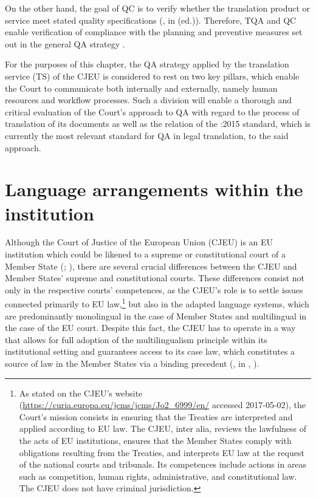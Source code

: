 \documentclass[output=paper]{langsci/langscibook}
\begin{document}
On the other hand, the goal of QC is to verify whether the translation product or service meet stated quality specifications (\citealt[169]{Lušicky2017}, in \citealt{Lommel2015} (ed.)). Therefore, TQA and QC enable verification of compliance with the planning and preventive measures set out in the general QA strategy \citep[169]{Lušicky2017}.

For the purposes of this chapter, the QA strategy applied by the translation service (TS) of the CJEU is considered to rest on two key pillars, which enable the Court to communicate both internally and externally, namely human resources and workflow processes. Such a division will enable a thorough and critical evaluation of the Court’s approach to QA with regard to the process of translation of its documents as well as the relation of the \citeauthor{ISO2015}:2015 standard, which is currently the most relevant standard for QA in legal translation, to the said approach.

\section{Language arrangements within the institution}\label{sec:kozbial:2}

Although the Court of Justice of the European Union (CJEU) is an EU institution which could be likened to a supreme or constitutional court of a Member State (\citealt[10]{Roper2011}; \citealt{Itzcovich2014}), there are several crucial differences between the CJEU and Member States’ supreme and constitutional courts. These differences consist not only in the respective courts’ competences, as the CJEU’s role is to settle issues connected primarily to EU law,\footnote{As stated on the CJEU’s website (\url{https://curia.europa.eu/jcms/jcms/Jo2_6999/en/} accessed 2017-05-02), the Court’s mission consists in ensuring that the Treaties are interpreted and applied according to EU law. The CJEU, inter alia, reviews the lawfulness of the acts of EU institutions, ensures that the Member States comply with obligations resulting from the Treaties, and interprets EU law at the request of the national courts and tribunals. Its competences include actions in areas such as competition, human rights, administrative, and constitutional law. The CJEU does not have criminal jurisdiction.} but also in the adapted language systems, which are predominantly monolingual in the case of Member States and multilingual in the case of the EU court. Despite this fact, the CJEU has to operate in a way that allows for full adoption of the multilingualism principle within its institutional setting and guarantees access to its case law, which constitutes a source of law in the Member States via a binding precedent (\citealt[86]{Łachacz2013}, in \citealt[626–628]{Arnull2006}, \citealt[221–232]{Sulikowski2005}).
\end{document}
